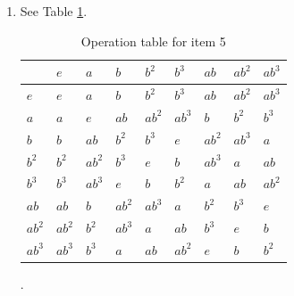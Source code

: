 \documentclass{article}
\begin{document}
\begin{enumerate}
    \item See Table \ref{tab:op-exercise-5G5}.
        \begin{table}[]
            \centering
            \begin{tabular}{l|llllllll}
                & $e$   & $a$   & $b$   & $b^2$ & $b^3$ & $ab$  & $ab^2$& $ab^3$\\ \hline
            $e$   & $e$   & $a$   & $b$   & $b^2$ & $b^3$ & $ab$  & $ab^2$& $ab^3$\\
            $a$   & $a$   & $e$   & $ab$  & $ab^2$& $ab^3$& $b$   & $b^2$ & $b^3$ \\
            $b$   & $b$   & $ab$  & $b^2$ & $b^3$ & $e$   & $ab^2$& $ab^3$& $a$   \\
            $b^2$ & $b^2$ & $ab^2$& $b^3$ & $e$   & $b$   & $ab^3$& $a$   & $ab$  \\
            $b^3$ & $b^3$ & $ab^3$& $e$   & $b$   & $b^2$ & $a$   & $ab$  & $ab^2$\\
            $ab$  & $ab$  & $b$   & $ab^2$& $ab^3$& $a$   & $b^2$ & $b^3$ & $e$   \\
            $ab^2$& $ab^2$& $b^2$ & $ab^3$& $a$   & $ab$  & $b^3$ & $e$   & $b$   \\
            $ab^3$& $ab^3$& $b^3$ & $a$   & $ab$  & $ab^2$& $e$   & $b$   & $b^2$
            \end{tabular}
            \caption{Operation table for item 5}.
            \label{tab:op-exercise-5G5}
        \end{table}
        

\end{enumerate}
\end{document}
